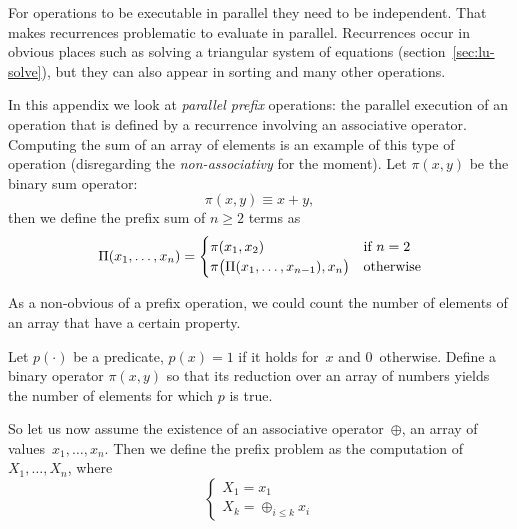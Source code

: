 
For operations to be executable in parallel they need to be independent.
That makes recurrences problematic to evaluate in parallel.
Recurrences occur in obvious places such as solving a triangular system 
of equations (section~\ref{sec:lu-solve}),
but they can also appear in sorting and many other operations.

In this appendix we look at \emph{parallel prefix} operations: the
parallel execution of an operation that is defined by a recurrence
involving an associative operator.  Computing the sum of an array of
elements is an example of this type of operation (disregarding the
\emph{non-associativy} for the moment).
Let $\pi(x,y)$ be the binary sum operator: \[ \pi(x,y)\equiv x+y, \]
then we define the prefix sum of $n\geq 2$ terms as
\[ \Pi(x_1,\ldots,x_n) =
\begin{cases}
\pi(x_1,x_2)&\hbox{if $n=2$}\\
\pi\bigl( \Pi(x_1,\ldots,x_{n-1}),x_n\bigr)&\hbox{otherwise} \\
\end{cases}
\]

As a non-obvious of a prefix operation, we could count the number of elements
of an array that have a certain property.

\begin{exercise}
  Let $p(\cdot)$ be a predicate, $p(x)=1$ if it holds for~$x$
  and 0~otherwise. Define a binary operator $\pi(x,y)$ so that
  its reduction over an array of numbers yields the number of 
  elements for which $p$ is true.
\end{exercise}

So let us now assume the existence of an associative operator~$\oplus$,
an array of values~$x_1,\ldots,x_n$. Then we define the prefix problem
as the computation of $X_1,\ldots,X_n$, where
\[
\begin{cases}
  X_1=x_1\\
  X_k=\oplus_{i\leq k} x_i
\end{cases}
\]

